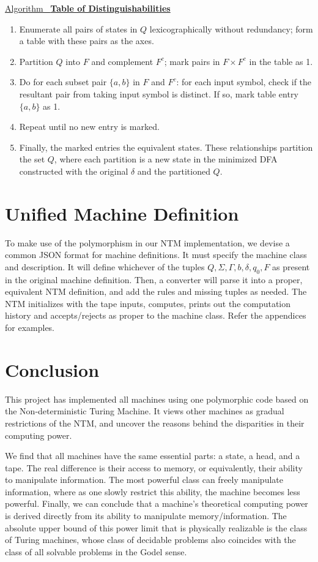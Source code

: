 \documentclass[12pt]{article}  %
\newcommand{\algtitle}[1]{\underline{Algorithm \ {\bf #1}} \vspace*{1mm}\\}
\begin{document}
\algtitle{Table of Distinguishabilities}
\begin{enumerate}
	\item Enumerate all pairs of states in $Q$ lexicographically without redundancy; form a table with these pairs as the axes.
	\item Partition $Q$ into $F$ and complement $F^c$; mark pairs in $F \times F^c$ in the table as 1.
	\item Do for each subset pair $\{a,b\}$ in $F$ and $F^c$:
	for each input symbol, check if the resultant pair from taking input symbol is distinct. If so, mark table entry $\{a,b\}$ as 1.
	\item Repeat until no new entry is marked.
	\item Finally, the marked entries the equivalent states. These relationships partition the set $Q$, where each partition is a new state in the minimized DFA constructed with the original $\delta$ and the partitioned $Q$.
\end{enumerate}





\section{Unified Machine Definition}
To make use of the polymorphism in our NTM implementation, we devise a common JSON format for machine definitions. It must specify the machine class and description. It will define whichever of the tuples $Q, \Sigma, \Gamma, b, \delta, q_0, F$ as present in the original machine definition. Then, a converter will parse it into a proper, equivalent NTM definition, and add the rules and missing tuples as needed. The NTM initializes with the tape inputs, computes, prints out the computation history and accepts/rejects as proper to the machine class. Refer the appendices for examples.



\section{Conclusion}
This project has implemented all machines using one polymorphic code based on the Non-deterministic Turing Machine. It views other machines as gradual restrictions of the NTM, and uncover the reasons behind the disparities in their computing power. 

We find that all machines have the same essential parts: a state, a head, and a tape. The real difference is their access to memory, or equivalently, their ability to manipulate information. The most powerful class can freely manipulate information, where as one slowly restrict this ability, the machine becomes less powerful. Finally, we can conclude that a machine's theoretical computing power is derived directly from its ability to manipulate memory/information. The absolute upper bound of this power limit that is physically realizable is the class of Turing machines, whose class of decidable problems also coincides with the class of all solvable problems in the Godel sense.
\end{document}
